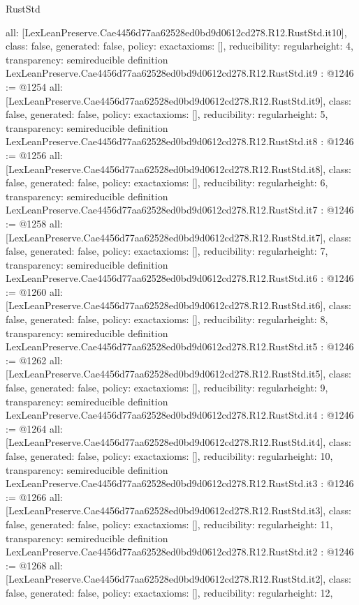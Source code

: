 \begin{lexlean}{RustStd}
\begin{coremodule}
{  all: [LexLeanPreserve.Cae4456d77aa62528ed0bd9d0612cd278.R12.RustStd.it10],
  class: false,
  generated: false,
  policy: exact{axioms: []},
  reducibility: regular{height: 4},
  transparency: semireducible
}
definition LexLeanPreserve.Cae4456d77aa62528ed0bd9d0612cd278.R12.RustStd.it9 : @1246 := @1254 {
  all: [LexLeanPreserve.Cae4456d77aa62528ed0bd9d0612cd278.R12.RustStd.it9],
  class: false,
  generated: false,
  policy: exact{axioms: []},
  reducibility: regular{height: 5},
  transparency: semireducible
}
definition LexLeanPreserve.Cae4456d77aa62528ed0bd9d0612cd278.R12.RustStd.it8 : @1246 := @1256 {
  all: [LexLeanPreserve.Cae4456d77aa62528ed0bd9d0612cd278.R12.RustStd.it8],
  class: false,
  generated: false,
  policy: exact{axioms: []},
  reducibility: regular{height: 6},
  transparency: semireducible
}
definition LexLeanPreserve.Cae4456d77aa62528ed0bd9d0612cd278.R12.RustStd.it7 : @1246 := @1258 {
  all: [LexLeanPreserve.Cae4456d77aa62528ed0bd9d0612cd278.R12.RustStd.it7],
  class: false,
  generated: false,
  policy: exact{axioms: []},
  reducibility: regular{height: 7},
  transparency: semireducible
}
definition LexLeanPreserve.Cae4456d77aa62528ed0bd9d0612cd278.R12.RustStd.it6 : @1246 := @1260 {
  all: [LexLeanPreserve.Cae4456d77aa62528ed0bd9d0612cd278.R12.RustStd.it6],
  class: false,
  generated: false,
  policy: exact{axioms: []},
  reducibility: regular{height: 8},
  transparency: semireducible
}
definition LexLeanPreserve.Cae4456d77aa62528ed0bd9d0612cd278.R12.RustStd.it5 : @1246 := @1262 {
  all: [LexLeanPreserve.Cae4456d77aa62528ed0bd9d0612cd278.R12.RustStd.it5],
  class: false,
  generated: false,
  policy: exact{axioms: []},
  reducibility: regular{height: 9},
  transparency: semireducible
}
definition LexLeanPreserve.Cae4456d77aa62528ed0bd9d0612cd278.R12.RustStd.it4 : @1246 := @1264 {
  all: [LexLeanPreserve.Cae4456d77aa62528ed0bd9d0612cd278.R12.RustStd.it4],
  class: false,
  generated: false,
  policy: exact{axioms: []},
  reducibility: regular{height: 10},
  transparency: semireducible
}
definition LexLeanPreserve.Cae4456d77aa62528ed0bd9d0612cd278.R12.RustStd.it3 : @1246 := @1266 {
  all: [LexLeanPreserve.Cae4456d77aa62528ed0bd9d0612cd278.R12.RustStd.it3],
  class: false,
  generated: false,
  policy: exact{axioms: []},
  reducibility: regular{height: 11},
  transparency: semireducible
}
definition LexLeanPreserve.Cae4456d77aa62528ed0bd9d0612cd278.R12.RustStd.it2 : @1246 := @1268 {
  all: [LexLeanPreserve.Cae4456d77aa62528ed0bd9d0612cd278.R12.RustStd.it2],
  class: false,
  generated: false,
  policy: exact{axioms: []},
  reducibility: regular{height: 12},
}
\end{coremodule}
\end{lexlean}
